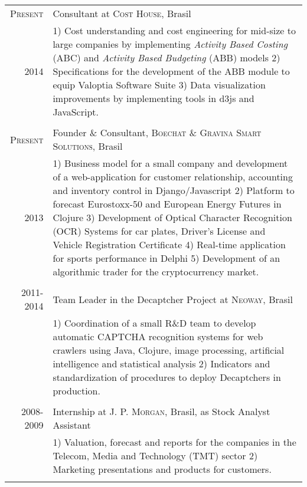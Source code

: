 \documentclass[a4paper,10pt]{article} %
\begin{document}
\begin{tabular}{r|p{11cm}}
\textsc{Present} & Consultant at \textsc{Cost House}, Brasil \\
\textsc{2014} & \footnotesize{
  1) Cost understanding and cost
  engineering for mid-size to large companies by implementing \textit{Activity Based
  Costing} (ABC) and \textit{Activity Based Budgeting} (ABB) models
  2) Specifications for the development of the ABB module to equip Valoptia Software
  Suite
  3) Data visualization improvements by implementing tools in d3js and JavaScript. }\\
\multicolumn{2}{c}{} \\


\textsc{Present} & Founder \& Consultant, \textsc{Boechat \&
  Gravina Smart Solutions}, Brasil \\
\textsc{2013} & \footnotesize{1) Business model for a small company and
  development of a web-application for
  customer relationship, accounting and inventory control in
  Django/Javascript
  2) Platform to forecast Eurostoxx-50 and European Energy Futures in
  Clojure
  3) Development of Optical Character Recognition (OCR) Systems for
  car plates, Driver's License and Vehicle Registration Certificate
  4) Real-time application for sports performance in Delphi
  5) Development of an algorithmic trader for the
  cryptocurrency market. 
  }
\\
\multicolumn{2}{c}{} \\


\textsc{2011-2014} & Team Leader in the Decaptcher Project at
\textsc{Neoway}, Brasil \\
& \footnotesize{
  1) Coordination of a small R\&D team to develop automatic
  CAPTCHA recognition systems for web crawlers using Java, Clojure,
  image processing, artificial intelligence and statistical analysis
  2) Indicators and standardization of procedures to deploy Decaptchers in production. } \\
\multicolumn{2}{c}{} \\


\textsc{2008-2009} & Internship at \textsc{J. P. Morgan}, Brasil, as Stock
Analyst Assistant \\
& \footnotesize{
  1) Valuation, forecast and reports for the companies in the Telecom,
  Media and Technology (TMT) sector
  2) Marketing presentations and products for customers.}\\
\multicolumn{2}{c}{} \\


\end{tabular}
\end{document}
